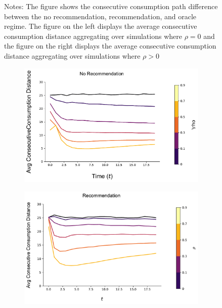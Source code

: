 \documentclass[format=acmsmall, review=true]{acmart}
\begin{document}
\begin{figure}[H]
\begin{subfigure}{.5\linewidth}
  \label{fig:sfig2}
\end{subfigure}
\caption*{\footnotesize Notes: The figure shows the consecutive consumption path difference between the no recommendation, recommendation, and oracle regime. The figure on the left displays the average consecutive consumption distance aggregating over simulations where $\rho = 0$ and the figure on the right displays the average consecutive consumption distance aggregating over simulations where $\rho > 0$}
\label{fig:correlation_consumption_path_n_100}
\end{figure}
\addtocounter{figure}{-1}


\begin{figure}[H]
\begin{subfigure}{.45\textwidth}
\includegraphics[width=\linewidth]{figures/rho_consumption_dist_N_100T_20.pdf}
\end{subfigure}
\begin{subfigure}{.45\textwidth}
\includegraphics[width=\linewidth]{figures/rho_consumption_dist_N_100T_20_partial.pdf}

\end{subfigure}
\end{figure}
\end{document}
